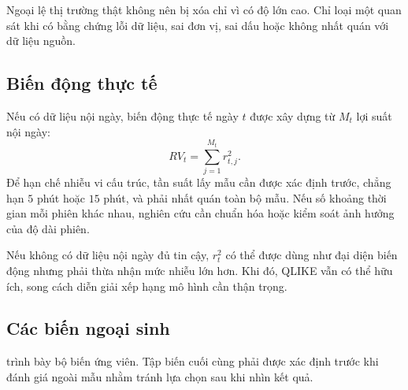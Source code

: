 \documentclass[12pt,a4paper]{article}
\numberwithin{equation}{section}
\begin{document}
Ngoại lệ thị trường thật không nên bị xóa chỉ vì có độ lớn cao. Chỉ loại một quan sát khi có bằng chứng lỗi dữ liệu, sai đơn vị, sai dấu hoặc không nhất quán với dữ liệu nguồn.

\subsection{Biến động thực tế}\label{subsec:realized-volatility}

Nếu có dữ liệu nội ngày, biến động thực tế ngày $t$ được xây dựng từ $M_t$ lợi suất nội ngày:
\begin{equation}
  RV_t=\sum_{j=1}^{M_t}r_{t,j}^{2}.
  \label{eq:realized-volatility}
\end{equation}
Để hạn chế nhiễu vi cấu trúc, tần suất lấy mẫu cần được xác định trước, chẳng hạn $5$ phút hoặc $15$ phút, và phải nhất quán toàn bộ mẫu. Nếu số khoảng thời gian mỗi phiên khác nhau, nghiên cứu cần chuẩn hóa hoặc kiểm soát ảnh hưởng của độ dài phiên.

Nếu không có dữ liệu nội ngày đủ tin cậy, $r_t^2$ có thể được dùng như đại diện biến động nhưng phải thừa nhận mức nhiễu lớn hơn. Khi đó, QLIKE vẫn có thể hữu ích, song cách diễn giải xếp hạng mô hình cần thận trọng.

\subsection{Các biến ngoại sinh}\label{subsec:exogenous-variables}

 trình bày bộ biến ứng viên. Tập biến cuối cùng phải được xác định trước khi đánh giá ngoài mẫu nhằm tránh lựa chọn sau khi nhìn kết quả.
\end{document}
